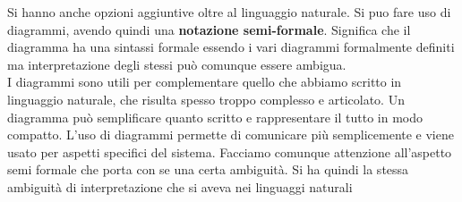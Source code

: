 Si hanno anche opzioni aggiuntive oltre al linguaggio naturale. Si puo fare uso di diagrammi, avendo quindi una \textbf{notazione semi-formale}. Significa che il diagramma ha una sintassi formale essendo i vari diagrammi formalmente definiti ma interpretazione degli stessi può comunque essere ambigua.\\
I diagrammi sono utili per complementare quello che abbiamo scritto in linguaggio naturale, che risulta spesso troppo complesso e articolato. Un diagramma può semplificare quanto scritto e rappresentare il tutto in modo compatto. L'uso di diagrammi permette di comunicare più semplicemente e viene usato per aspetti specifici del sistema. Facciamo comunque attenzione all'aspetto semi formale che porta con se una certa ambiguità. Si ha quindi la stessa ambiguità di interpretazione che si aveva nei linguaggi naturali\\ 

